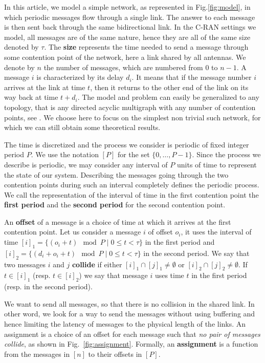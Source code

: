 \documentclass[a4paper,UKenglish,cleveref, autoref, thm-restate]{lipics-v2019}
\begin{document}
In this article, we model a simple network, as represented in Fig.\ref{fig:model}, in which periodic messages flow through a single link. The answer to each message is then sent back through the same bidirectional link. In the C-RAN settings we model, all messages are of the same nature, hence they are all of the same size denoted by $\tau$. The \textbf{size} represents the time needed to send a message through some contention point of the network, here a link shared by all antennas. We denote by $n$ the number of messages, which are numbered from $0$ to $n-1$. A message $i$ is characterized by its delay $d_i$. It means that if the message number $i$ arrives at the link at time $t$, then it returns to the other end of the link on its way back at time $t + d_i$. 
 The model and problem can easily be generalized to any topology, that is any directed acyclic multigraph with any number of contention points, see \cite{dominique2018deterministic}. We choose here to focus on the simplest non trivial such network, for which we can still obtain some theoretical results. 

The time is discretized and the process we consider is periodic of fixed integer period $P$. We use the notation $[P]$ for the set $\{0,\dots,P-1\}$. Since the process we describe is periodic, we may consider any interval of $P$ units of time
to represent the state of our system. Describing the messages going through the two contention points during such an interval completely defines the periodic process. We call the representation of the interval
of time in the first contention point the \textbf{first period} and the \textbf{second period}
for the second contention point.

An \textbf{offset} of a message is a choice of time at which it arrives
at the first contention point. Let us consider a message $i$
of offset $o_i$, it uses the interval of time $[i]_1 = \{ (o_i + t) \mod P \mid 0 \leq t < \tau \}$ in the first period and $[i]_2 = \{ (d_i + o_i + t) \mod P \mid 0 \leq t < \tau \}$ in the second period. We say that two messages $i$ and $j$ \textbf{collide} if either $[i]_1 \cap [j]_1 \neq \emptyset $ or $[i]_2 \cap [j]_2 \neq \emptyset $. If $t \in [i]_1$ (resp. $t \in [i]_2$) we say that message $i$ uses time $t$ in the first period (resp. in the second period).

We want to send all messages, so that there is no collision in the shared link.
In other word, we look for a way to send the messages without using buffering and 
hence limiting the latency of messages to the physical length of the links. An assignment is a
choice of an offset for each message such that \emph{no pair of messages collide}, as shown in Fig.~\ref{fig:assignment}.
Formally, an \textbf{assignment} is a function from the messages in $[n]$ to their offsets in $[P]$.  
\end{document}
